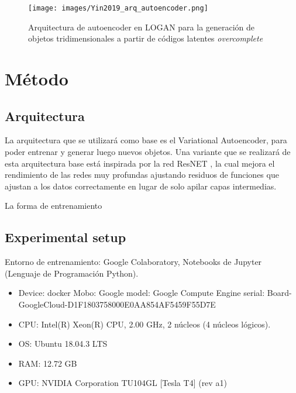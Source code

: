 \documentclass[12pt, spanish]{article}
\begin{document}
\begin{figure}[h]
\texttt{[image: images/Yin2019\_arq\_autoencoder.png]}
\centering
\caption{Arquitectura de autoencoder en LOGAN \cite{Yin2019} para la generación de objetos tridimensionales a partir de códigos latentes \textit{overcomplete}}
\label{LOGAN_arq_ae}
\end{figure}


\clearpage

\section{Método}%
\label{sec:metodo}

\subsection{Arquitectura}%
\label{sub:arquitectura}
La arquitectura que se utilizará como base es el Variational Autoencoder, para
poder entrenar y generar luego nuevos objetos. Una variante que se realizará
de esta arquitectura base está inspirada por la red ResNET \cite{He_2016}, la
cual mejora el rendimiento de las redes muy profundas ajustando residuos de
funciones que ajustan a los datos correctamente en lugar de solo apilar capas
intermedias.

La forma de entrenamiento

\subsection{Experimental setup}%
\label{sub:experimental_setup}

Entorno de entrenamiento: Google Colaboratory, Notebooks de Jupyter (Lenguaje de Programación Python).
\begin{itemize}
    \item Device: docker Mobo: Google model: Google Compute Engine serial: Board-GoogleCloud-D1F1803758000E0AA854AF5459F55D7E
    \item CPU: Intel(R) Xeon(R) CPU, 2.00 GHz, 2 núcleos (4 núcleos lógicos).
    \item OS: Ubuntu 18.04.3 LTS
    \item RAM: 12.72 GB
    \item GPU: NVIDIA Corporation TU104GL [Tesla T4] (rev a1)
\end{itemize}
\end{document}

